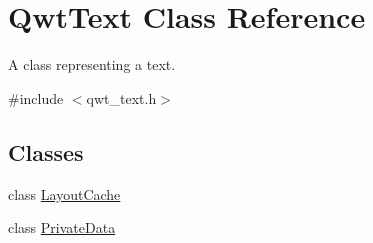 \hypertarget{class_qwt_text}{\section{Qwt\-Text Class Reference}
\label{class_qwt_text}
}


A class representing a text.  




{\ttfamily \#include $<$qwt\-\_\-text.\-h$>$}

\subsection*{Classes}
\begin{DoxyCompactItemize}
\item 
class \hyperlink{class_qwt_text_1_1_layout_cache}{Layout\-Cache}
\item 
class \hyperlink{class_qwt_text_1_1_private_data}{Private\-Data}
\end{DoxyCompactItemize}
